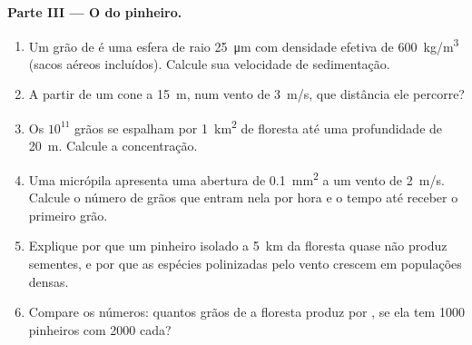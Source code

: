\begin{problem}
\medskip
\noindent\textbf{Parte III --- O  do pinheiro.}
\begin{enumerate}[resume]
  \item Um grão de  é uma esfera de raio \qty{25}{\micro m} com
        densidade efetiva de \qty{600}{kg/m^3} (sacos aéreos
        incluídos). Calcule sua velocidade de sedimentação.
  \item A partir de um cone a \qty{15}{m}, num vento de \qty{3}{m/s},
        que distância ele percorre?
  \item Os $10^{11}$ grãos se espalham por \qty{1}{km^2} de floresta
        até uma profundidade de \qty{20}{m}. Calcule a concentração.
  \item Uma micrópila apresenta uma abertura de \qty{0.1}{mm^2} a um
        vento de \qty{2}{m/s}. Calcule o número de grãos que entram
        nela por hora e o tempo até receber o primeiro grão.
  \item Explique por que um pinheiro isolado a \qty{5}{km} da floresta
        quase não produz sementes, e por que as espécies polinizadas
        pelo vento crescem em populações densas.
  \item Compare os números: quantos grãos de  a floresta produz
        por , se ela tem \num{1000} pinheiros com \num{2000}
         cada?
\end{enumerate}


\end{problem}
